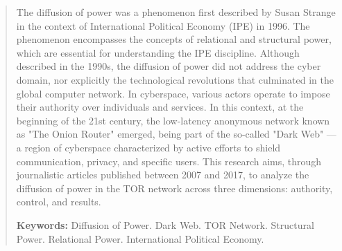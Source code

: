 \begin{abstract}
    The diffusion of power was a phenomenon first described by Susan Strange in the context of International Political Economy (IPE) in 1996. The phenomenon encompasses the concepts of relational and structural power, which are essential for understanding the IPE discipline. Although described in the 1990s, the diffusion of power did not address the cyber domain, nor explicitly the technological revolutions that culminated in the global computer network. In cyberspace, various actors operate to impose their authority over individuals and services. In this context, at the beginning of the 21st century, the low-latency anonymous network known as "The Onion Router" emerged, being part of the so-called "Dark Web" — a region of cyberspace characterized by active efforts to shield communication, privacy, and specific users. This research aims, through journalistic articles published between 2007 and 2017, to analyze the diffusion of power in the TOR network across three dimensions: authority, control, and results. 

    \vspace{1em}
    \textbf{Keywords:} Diffusion of Power. Dark Web. TOR Network. Structural Power. Relational Power. International Political Economy.
\end{abstract}